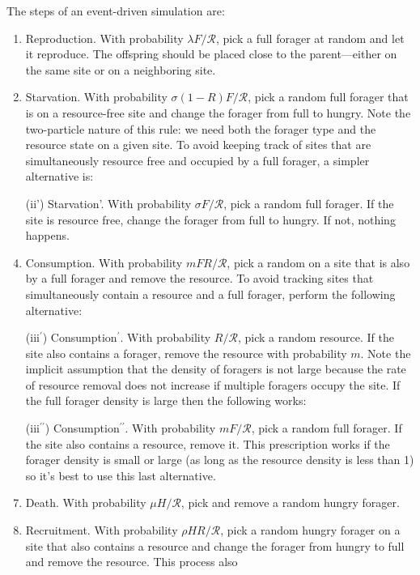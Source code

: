 \documentclass[11pt]{iopart}
\begin{document}
The steps of an event-driven simulation are:
\begin{enumerate}
\item Reproduction.  With probability $\lambda F/\mathcal{R}$, pick a full
  forager at random and let it reproduce.  The offspring should be placed
  close to the parent---either on the same site or on a neighboring site.
\item Starvation.  With probability $\sigma(1-R)F/\mathcal{R}$, pick a random
  full forager that is on a resource-free site and change the forager from
  full to hungry.  Note the two-particle nature of this rule: we need both
  the forager type and the resource state on a given site.  To avoid keeping
  track of sites that are simultaneously resource free and occupied by a full
  forager, a simpler alternative is:
\item[(ii')] Starvation'.  With probability $\sigma F/\mathcal{R}$, pick a
  random full forager.  If the site is resource free, change the forager from
  full to hungry.  If not, nothing happens.
\item Consumption.  With probability $mFR/\mathcal{R}$, pick a random on a
  site that is also by a full forager and remove the resource.  To avoid
  tracking sites that simultaneously contain a resource and a full forager,
  perform the following alternative:
\item[(iii$^\prime$)] Consumption$^\prime$.  With probability
  $R/\mathcal{R}$, pick a random resource.  If the site also contains a
  forager, remove the resource with probability $m$.  Note the implicit
  assumption that the density of foragers is not large because the rate of
  resource removal does not increase if multiple foragers occupy the site.
  If the full forager density is large then the following works:
\item[(iii$^{\prime\prime}$)] Consumption$^{\prime\prime}$.  With probability
  $m F/\mathcal{R}$, pick a random full forager.  If the site also contains a
  resource, remove it.  This prescription works if the forager density is
  small or large (as long as the resource density is less than 1) so it's
  best to use this last alternative.
\item Death.  With probability $\mu H/\mathcal{R}$, pick and remove a random
  hungry forager.
\item Recruitment.  With probability $\rho HR/\mathcal{R}$, pick a random
  hungry forager on a site that also contains a resource and change the
  forager from hungry to full and remove the resource.  This process also

\end{enumerate}
\end{document}

